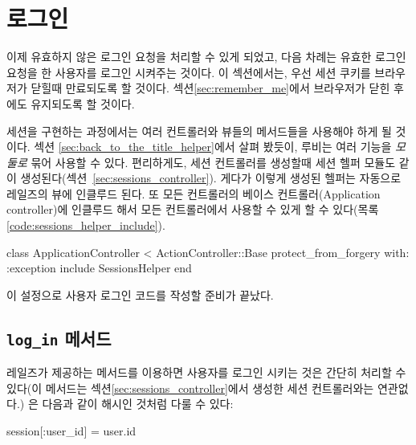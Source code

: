 \section{로그인} \label{sec:logging_in} 

이제 유효하지 않은 로그인 요청을 처리할 수 있게 되었고, 다음 차례는 유효한 로그인 요청을 한 사용자를 로그인 시켜주는 것이다. 이 섹션에서는, 우선 세션 쿠키를 브라우저가 닫힐때 만료되도록 할 것이다. 섹션\ref{sec:remember_me}에서 브라우저가 닫힌 후에도 유지되도록 할 것이다. 

세션을 구현하는 과정에서는 여러 컨트롤러와 뷰들의 메서드들을 사용해야 하게 될 것이다. 섹션 \ref{sec:back_to_the_title_helper}에서 살펴 봤듯이, 루비는 여러 기능을 \emph{모둘로} 묶어 사용할 수 있다. 편리하게도, 세션 컨트롤러를 생성할때 세션 헬퍼 모듈도 같이 생성된다(섹션~\ref{sec:sessions_controller}). 게다가 이렇게 생성된 헬퍼는 자동으로 레일즈의 뷰에 인클루드 된다. 또 모든 컨트롤러의 베이스 컨트롤러(Application controller)에 인클루드 해서 모든 컨트롤러에서 사용할 수 있게 할 수 있다(목록 \ref{code:sessions_helper_include}). 

\begin{codelisting} \label{code:sessions_helper_include}  

\begin{code} class ApplicationController < ActionController::Base protect_from_forgery with: :exception include SessionsHelper end \end{code} \end{codelisting} 

\noindent 이 설정으로 사용자 로그인 코드를 작성할 준비가 끝났다. 

\subsection{\texttt{log\_in} 메서드} \label{sec:a_working_log_in_method} 

레일즈가 제공하는  메서드를 이용하면 사용자를 로그인 시키는 것은 간단히 처리할 수 있다(이 메서드는 섹션\ref{sec:sessions_controller}에서 생성한 세션 컨트롤러와는 연관없다.) 은 다음과 같이 해시인 것처럼 다룰 수 있다: 

\begin{code} session[:user_id] = user.id \end{code} 

